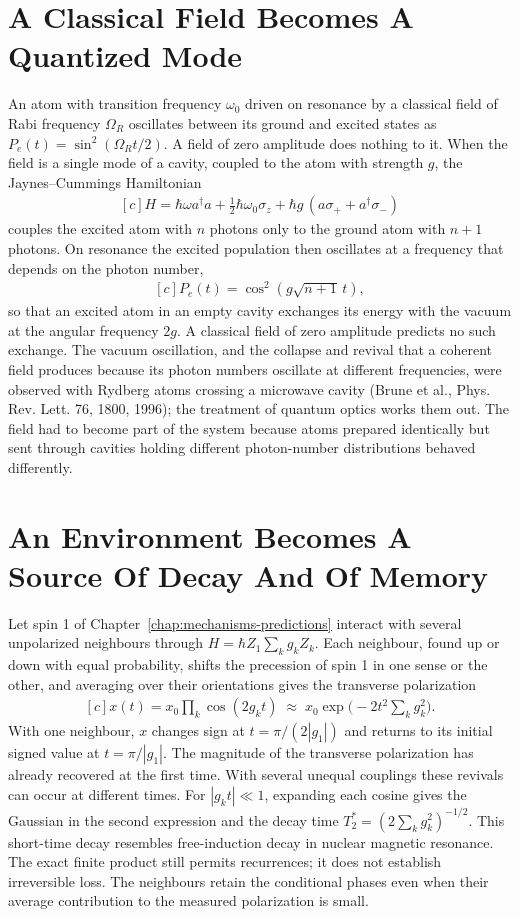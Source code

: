 \documentclass[11pt,oneside]{book}
\newenvironment{centeredalign}{\[\begin{gathered}[c]}{\end{gathered}\]}
\begin{document}
\section{A Classical Field Becomes A Quantized Mode}
An atom with transition frequency \(\omega_0\) driven on resonance by a classical field of Rabi frequency \(\Omega_R\)
oscillates between its ground and excited states as \(P_e(t)=\sin^2(\Omega_Rt/2)\). A field of zero amplitude does
nothing to it. When the field is a single mode of a cavity, coupled to the atom with strength \(g\), the Jaynes--Cummings
Hamiltonian
\begin{centeredalign}
H=\hbar\omega a^\dagger a+\tfrac12\hbar\omega_0\sigma_z+\hbar g\,(a\sigma_++a^\dagger\sigma_-)
\end{centeredalign}
couples the excited atom with \(n\) photons only to the ground atom with \(n+1\) photons. On resonance the excited
population then oscillates at a frequency that depends on the photon number,
\begin{centeredalign}
P_e(t)=\cos^2\!\left(g\sqrt{n+1}\,t\right),
\end{centeredalign}
so that an excited atom in an empty cavity exchanges its energy with the vacuum at the angular frequency \(2g\). A
classical field of zero amplitude predicts no such exchange. The vacuum oscillation, and the collapse and revival that a
coherent field produces because its photon numbers oscillate at different frequencies, were observed with Rydberg atoms
crossing a microwave cavity (Brune et al., Phys. Rev. Lett. 76, 1800, 1996); the treatment of quantum optics works them
out. The field had to become part of the system because atoms prepared identically but sent through cavities holding
different photon-number distributions behaved differently.

\section{An Environment Becomes A Source Of Decay And Of Memory}
Let spin 1 of Chapter~\ref{chap:mechanisms-predictions} interact with several unpolarized neighbours through
\(H=\hbar Z_1\sum_kg_kZ_k\). Each neighbour, found up or down with equal probability, shifts the precession of spin 1 in
one sense or the other, and averaging over their orientations gives the transverse polarization
\begin{centeredalign}
x(t)=x_0\prod_k\cos(2g_kt)\;\approx\;x_0\exp\!\Big(-2t^2\sum_kg_k^2\Big).
\end{centeredalign}
With one neighbour, \(x\) changes sign at \(t=\pi/(2|g_1|)\)
and returns to its initial signed value at \(t=\pi/|g_1|\).
The magnitude of the transverse polarization has already recovered
at the first time. With several unequal couplings these revivals can
occur at different times. For \(|g_kt|\ll1\), expanding each cosine
gives the Gaussian in the second expression and the decay time
\(T_2^*=(2\sum_kg_k^2)^{-1/2}\). This short-time decay resembles
free-induction decay in nuclear magnetic resonance. The exact finite
product still permits recurrences; it does not establish irreversible
loss. The neighbours retain the conditional phases even when their
average contribution to the measured polarization is small.
\end{document}
